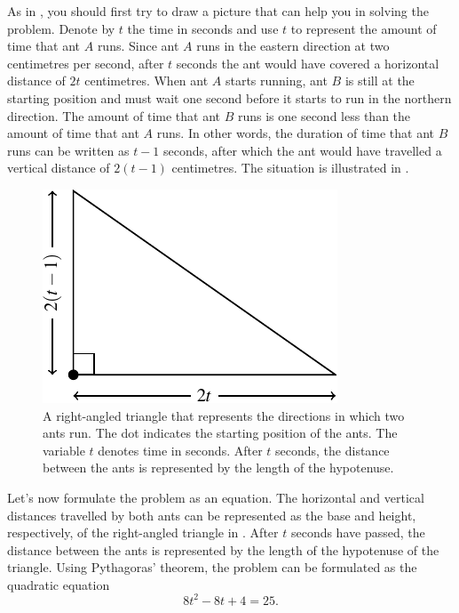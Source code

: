 \documentclass[a4paper,oneside,12pt]{article}
\begin{document}
\begin{solution}
As in , you should first try to
draw a picture that can help you in solving the problem.  Denote by
$t$ the time in seconds and use $t$ to represent the amount of time
that ant $A$ runs.  Since ant $A$ runs in the eastern direction at two
centimetres per second, after $t$ seconds the ant would have covered a
horizontal distance of $2t$ centimetres.  When ant $A$ starts running,
ant $B$ is still at the starting position and must wait one second
before it starts to run in the northern direction.  The amount of time
that ant $B$ runs is one second less than the amount of time that ant
$A$ runs.  In other words, the duration of time that ant $B$ runs can
be written as $t - 1$ seconds, after which the ant would have
travelled a vertical distance of $2(t - 1)$ centimetres.  The
situation is illustrated in .

\begin{figure}[!htbp]
\centering
\includegraphics[scale=1]{image/09/running-ants.pdf}
\caption{%
  A right-angled triangle that represents the directions in which two
  ants run.  The dot indicates the starting position of the ants.  The
  variable $t$ denotes time in seconds.  After $t$ seconds, the
  distance between the ants is represented by the length of the
  hypotenuse.
}
\label{fig:running_ants_triangle}
\end{figure}

Let's now formulate the problem as an equation.  The horizontal and
vertical distances travelled by both ants can be represented as the
base and height, respectively, of the right-angled triangle in
.  After $t$ seconds have passed,
the distance between the ants is represented by the length of the
hypotenuse of the triangle.  Using Pythagoras' theorem, the problem
can be formulated as the quadratic equation
\begin{equation}
\label{eqn:running_ants_quadratic_equation}
8t^2 - 8t + 4
=
25.
\end{equation}


\end{solution}
\end{document}
